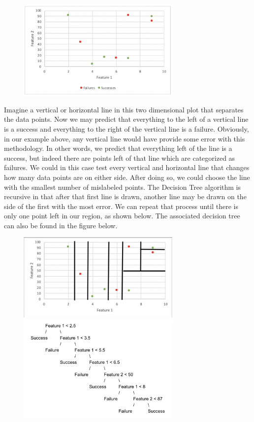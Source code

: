 \begin{center}
\begin{figure}[]
\includegraphics[width=8cm]{body/background/blanktree.png}
\end{figure}
\end{center}

Imagine a vertical or horizontal line in this two dimensional plot that separates the data points. Now we may predict that everything to the left of a vertical line is a success and everything to the right of the vertical line is a failure. Obviously, in our example above, any vertical line would have provide some error with this methodology. In other words, we predict that everything left of the line is a success, but indeed there are points left of that line which are categorized as failures. We could in this case test every vertical and horizontal line that changes how many data points are on either side. After doing so, we could choose the line with the smallest number of mislabeled points. The Decision Tree algorithm is recursive in that after that first line is drawn, another line may be drawn on the side of the first with the most error. We can repeat that process until there is only one point left in our region, as shown below. The associated decision tree can also be found in the figure below. 

\begin{center}
\begin{figure}[]
\includegraphics[width=8cm]{body/background/cuttree.png}
\includegraphics[width=8cm]{body/background/decisiontree.png}
\end{figure}
\end{center}

